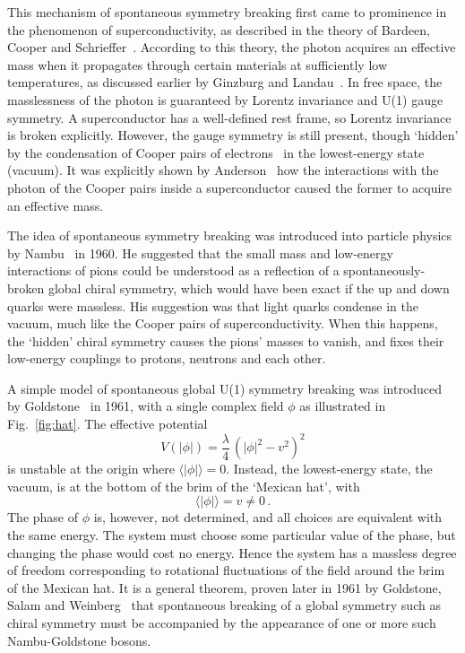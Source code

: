 \documentclass[12pt]{article}
\newcommand{\beq}{\begin{equation}}
\newcommand{\eeq}{\end{equation}}
\numberwithin{equation}{section}
\begin{document}
This mechanism of spontaneous symmetry breaking first came to prominence in
the phenomenon of superconductivity, as described in the theory of Bardeen, Cooper and Schrieffer~\cite{BCS}.
According to this theory, the photon acquires an effective mass when it propagates through certain materials
at sufficiently low temperatures, as discussed earlier by Ginzburg and Landau~\cite{GL}. In free space, 
the masslessness of the photon is guaranteed by Lorentz invariance and U(1) gauge symmetry. 
A superconductor has a well-defined rest frame, so Lorentz invariance is broken explicitly. However, the gauge
symmetry is still present, though `hidden' by the condensation of Cooper pairs of electrons~\cite{Cooper} in the lowest-energy
state (vacuum). It was explicitly shown by Anderson~\cite{Anderson} how the interactions 
with the photon of the Cooper pairs inside a superconductor caused the former to acquire an effective mass.

The idea of spontaneous symmetry breaking was introduced into particle physics by Nambu~\cite{Nambu} in 1960. 
He suggested that the small mass and low-energy interactions of pions could be understood as a reflection of a
spontaneously-broken global chiral symmetry, which would have been exact if the up and down quarks were massless. His
suggestion was that light quarks condense in the vacuum, much like the Cooper pairs of superconductivity.
When this happens, the `hidden' chiral symmetry causes the pions' masses to vanish, and fixes their low-energy couplings 
to protons, neutrons and each other.

A simple model of spontaneous global U(1) symmetry breaking was introduced by Goldstone~\cite{Goldstone} in 1961,
with a single complex field $\phi$ as illustrated in
Fig.~\ref{fig:hat}.  The effective potential
%
\beq V(|\phi|) =
\frac{\lambda}{4} \, (|\phi|^2 - v^2)^2\label{Vphi}\eeq 
\noindent
is unstable at the origin where $\langle |\phi| \rangle = 0$. Instead, the
lowest-energy state, the vacuum, is at the bottom of the brim of the
`Mexican hat', with 
%
\beq\langle |\phi| \rangle = v\ne 0 \, .\label{phivev}\eeq 
\noindent
The phase of $\phi$ is, however, not determined, and all choices are
equivalent with the same energy. The system must choose some
particular value of the phase, but changing the phase would cost no
energy. Hence the system has a massless degree of freedom
corresponding to rotational fluctuations of the field around the brim
of the Mexican hat. It is a general theorem, proven later in 1961 by
Goldstone, Salam and Weinberg~\cite{GSW} that spontaneous breaking of
a global symmetry such as chiral symmetry must be accompanied by the
appearance of one or more such Nambu-Goldstone bosons.
\end{document}
